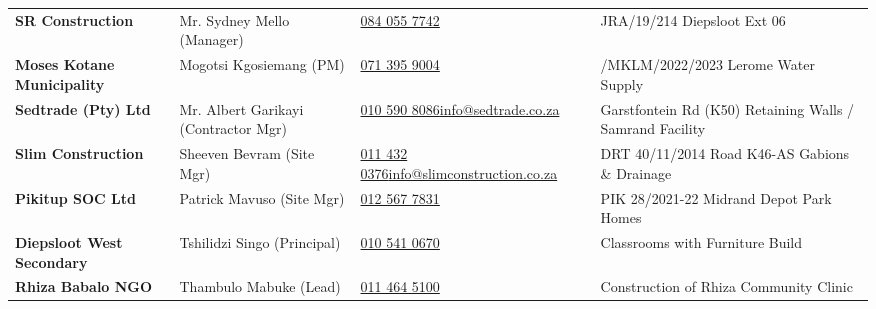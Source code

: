 \documentclass[a4paper,11pt]{article}
\begin{document}
\begin{tabularx}{\textwidth}{@{}
    >{\raggedright\arraybackslash}p{3.5cm} 
    >{\raggedright\arraybackslash}p{3.1cm} 
    >{\raggedright\arraybackslash}p{4.2cm} 
    >{\raggedright\arraybackslash}X
@{}}
\fontsize{7.6pt}{9.4pt}\selectfont\bfseries SR Construction & \fontsize{7.6pt}{9.4pt}\selectfont Mr. Sydney Mello (Manager) & \fontsize{7.6pt}{9.4pt}\selectfont \href{tel:0840557742}{084 055 7742} & \fontsize{7.6pt}{9.4pt}\selectfont JRA/19/214 Diepsloot Ext 06 \\
\rowcolor{mhbluelight}
\fontsize{7.6pt}{9.4pt}\selectfont\bfseries Moses Kotane Municipality & \fontsize{7.6pt}{9.4pt}\selectfont Mogotsi Kgosiemang (PM) & \fontsize{7.6pt}{9.4pt}\selectfont \href{tel:0713959004}{071 395 9004} & \fontsize{7.6pt}{9.4pt}\selectfont 014/MKLM/2022/2023 Lerome Water Supply \\
\fontsize{7.6pt}{9.4pt}\selectfont\bfseries Sedtrade (Pty) Ltd & \fontsize{7.6pt}{9.4pt}\selectfont Mr. Albert Garikayi (Contractor Mgr) & \fontsize{7.6pt}{9.4pt}\selectfont \href{tel:0105908086}{010 590 8086}\newline\href{mailto:info@sedtrade.co.za}{info@sedtrade.co.za} & \fontsize{7.6pt}{9.4pt}\selectfont Garstfontein Rd (K50) Retaining Walls / Samrand Facility \\
\rowcolor{mhbluelight}
\fontsize{7.6pt}{9.4pt}\selectfont\bfseries Slim Construction & \fontsize{7.6pt}{9.4pt}\selectfont Sheeven Bevram (Site Mgr) & \fontsize{7.6pt}{9.4pt}\selectfont \href{tel:0114320376}{011 432 0376}\newline\href{mailto:info@slimconstruction.co.za}{info@slimconstruction.co.za} & \fontsize{7.6pt}{9.4pt}\selectfont DRT 40/11/2014 Road K46-AS Gabions \& Drainage \\
\fontsize{7.6pt}{9.4pt}\selectfont\bfseries Pikitup SOC Ltd & \fontsize{7.6pt}{9.4pt}\selectfont Patrick Mavuso (Site Mgr) & \fontsize{7.6pt}{9.4pt}\selectfont \href{tel:0125677831}{012 567 7831} & \fontsize{7.6pt}{9.4pt}\selectfont PIK 28/2021-22 Midrand Depot Park Homes \\
\rowcolor{mhbluelight}
\fontsize{7.6pt}{9.4pt}\selectfont\bfseries Diepsloot West Secondary & \fontsize{7.6pt}{9.4pt}\selectfont Tshilidzi Singo (Principal) & \fontsize{7.6pt}{9.4pt}\selectfont \href{tel:0105410670}{010 541 0670} & \fontsize{7.6pt}{9.4pt}\selectfont 4 Classrooms with Furniture Build \\
\fontsize{7.6pt}{9.4pt}\selectfont\bfseries Rhiza Babalo NGO & \fontsize{7.6pt}{9.4pt}\selectfont Thambulo Mabuke (Lead) & \fontsize{7.6pt}{9.4pt}\selectfont \href{tel:0114645100}{011 464 5100} & \fontsize{7.6pt}{9.4pt}\selectfont Construction of Rhiza Community Clinic \\
\end{tabularx}
\renewcommand{\arraystretch}{1}
\end{document}
